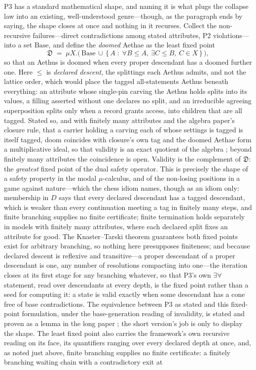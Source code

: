 \documentclass[11pt]{article}
\theoremstyle{definition}
\newcommand{\Aethus}{Aethus}
\begin{document}
P3 has a standard mathematical shape, and naming it is what plugs the collapse law into an existing, well-understood genre---though, as the paragraph ends by saying, the shape closes at once and nothing in it recurses. Collect the non-recursive failures---direct contradictions among stated attributes, P2 violations---into a set $\mathrm{Base}$, and define the \emph{doomed} Aethae as the least fixed point
\begin{equation*}
\mathfrak{D} \;=\; \mu X.\big(\, \mathrm{Base} \,\cup\, \{\, A \;:\; \forall B \le A,\ \exists C \le B,\ C \in X \,\}\,\big),
\end{equation*}
so that an \Aethus{} is doomed when every proper descendant has a doomed further one. Here $\le$ is \emph{declared descent}, the splittings each \Aethus{} admits, and not the lattice order, which would place the tagged all-statements \Aethus{} beneath everything: an attribute whose single-pin carving the \Aethus{} holds splits into its values, a filling asserted without one declares no split, and an irreducible agreeing superposition splits only when a record grants access, into children that are all tagged. Stated so, and with finitely many attributes and the algebra paper's closure rule, that a carrier holding a carving each of whose settings is tagged is itself tagged, doom coincides with closure's own tag and the doomed Aethae form a multiplicative ideal, so that validity is an exact quotient of the algebra \cite{Aethus}; beyond finitely many attributes the coincidence is open. Validity is the complement of $\mathfrak{D}$: the \emph{greatest} fixed point of the dual safety operator. This is precisely the shape of a safety property in the modal $\mu$-calculus, and of the non-losing positions in a game against nature---which the chess idiom names, though as an idiom only: membership in $D$ says that every declared descendant has a tagged descendant, which is weaker than every continuation meeting a tag in finitely many steps, and finite branching supplies no finite certificate; finite termination holds separately in models with finitely many attributes, where each declared split fixes an attribute for good. The Knaster--Tarski theorem guarantees both fixed points exist for arbitrary branching, so nothing here presupposes finiteness; and because declared descent is reflexive and transitive---a proper descendant of a proper descendant is one, any number of resolutions compacting into one---the iteration closes at its first stage for any branching whatever, so that P3's own $\exists\forall$ statement, read over descendants at every depth, is the fixed point rather than a seed for computing it: a state is valid exactly when some descendant has a cone free of base contradictions. The equivalence between P3 as stated and this fixed-point formulation, under the base-generation reading of invalidity, is stated and proven as a lemma in the long paper \cite{Aethus}; the short version's job is only to display the shape. The least fixed point also carries the framework's own recursive reading on its face, its quantifiers ranging over every declared depth at once, and, as noted just above, finite branching supplies no finite certificate: a finitely branching waiting chain with a contradictory exit at 
\end{document}
